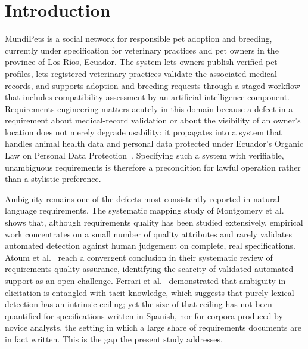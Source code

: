 \documentclass[pdflatex,sn-mathphys-num]{sn-jnl}
\theoremstyle{thmstyleone}%
\theoremstyle{thmstyletwo}%
\theoremstyle{thmstylethree}%
\begin{document}

\maketitle

\section{Introduction}\label{sec:intro}

MundiPets is a social network for responsible pet adoption and breeding,
currently under specification for veterinary practices and pet owners in the
province of Los Ríos, Ecuador. The system lets owners publish verified pet
profiles, lets registered veterinary practices validate the associated medical
records, and supports adoption and breeding requests through a staged workflow
that includes compatibility assessment by an artificial-intelligence component.
Requirements engineering matters acutely in this domain because a defect in a
requirement about medical-record validation or about the visibility of an
owner's location does not merely degrade usability: it propagates into a system
that handles animal health data and personal data protected under Ecuador's
Organic Law on Personal Data Protection~\cite{lopdp2021}. Specifying such a
system with verifiable, unambiguous requirements is therefore a precondition for
lawful operation rather than a stylistic preference.

Ambiguity remains one of the defects most consistently reported in
natural-language requirements. The systematic mapping study of Montgomery et
al.~\cite{montgomery2022} shows that, although requirements quality has been
studied extensively, empirical work concentrates on a small number of quality
attributes and rarely validates automated detection against human judgement on
complete, real specifications. Atoum et al.~\cite{atoum2021} reach a convergent
conclusion in their systematic review of requirements quality assurance,
identifying the scarcity of validated automated support as an open challenge.
Ferrari et al.~\cite{ferrari2016} demonstrated that ambiguity in elicitation is
entangled with tacit knowledge, which suggests that purely lexical detection has
an intrinsic ceiling; yet the size of that ceiling has not been quantified for
specifications written in Spanish, nor for corpora produced by novice analysts,
the setting in which a large share of requirements documents are in fact
written. This is the gap the present study addresses.
\end{document}
